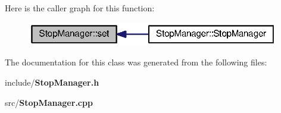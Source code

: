 Here is the caller graph for this function\+:\nopagebreak
\begin{figure}[H]
\begin{center}
\leavevmode
\includegraphics[width=312pt]{class_stop_manager_a2c22b4194c71d20793efbb69be1ba548_icgraph}
\end{center}
\end{figure}




The documentation for this class was generated from the following files\+:\begin{DoxyCompactItemize}
\item 
include/{\bf Stop\+Manager.\+h}\item 
src/{\bf Stop\+Manager.\+cpp}\end{DoxyCompactItemize}
